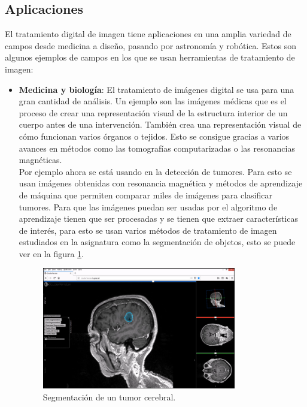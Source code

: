 \subsection{Aplicaciones}
El tratamiento digital de imagen tiene aplicaciones en una amplia variedad de campos desde medicina a diseño, pasando por astronomía y robótica\cite{Usos}.  Estos son algunos ejemplos de campos en los que se usan herramientas de tratamiento de imagen:
\begin{itemize}
\item \textbf{Medicina y biología}: El tratamiento de imágenes digital se usa para una gran cantidad de análisis. Un ejemplo son las imágenes médicas que es el proceso de crear una representación visual de la estructura interior de un cuerpo antes de una intervención. También crea una representación visual de cómo funcionan varios órganos o tejidos. Esto se consigue gracias a varios avances en métodos como las tomografías computarizadas o las resonancias magnéticas.\\

Por ejemplo ahora se está usando en la detección de tumores\cite{Tumores}. Para esto se usan imágenes obtenidas con resonancia magnética y métodos de aprendizaje de máquina que permiten comparar miles de imágenes para clasificar tumores. Para que las imágenes puedan ser usadas por el algoritmo de aprendizaje tienen que ser procesadas y se tienen que extraer características de interés, para esto se usan varios métodos de tratamiento de imagen estudiados en la asignatura como la segmentación de objetos, esto se puede ver en la figura \ref{tumores}.\\

\begin{figure}[h]
\centering
\includegraphics[width=0.8\textwidth]{imagenes/tumores.png}
\caption{Segmentación de un tumor cerebral.}
\label{tumores}
\end{figure}


\end{itemize}
